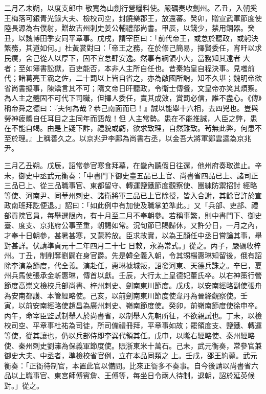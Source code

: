\begin{pinyinscope}
 二月乙未朔，以度支郎中
 敬寬為山劍行營糧料使。嚴礪奏收劍州。乙丑，入朝奚王梅落可銀青光錄大夫、檢校司空，封饒樂郡王，放還蕃。癸卯，贈宣武軍節度使陸長源為右僕射，贈故吉州刺史姜公輔禮部尚書。甲辰，以錢少，禁用銅器。癸丑，以魏博田季安同平章事。戊戌，謂宰臣曰：「前代帝王，或怠於聽政，或躬決繁務，其道如何。」杜黃裳對曰：「帝王之務，在於修己簡易，擇賢委任，宵旰以求民瘼，舍己從人以厚下，固不宜怠肆安逸。然事有綱領小大，當務知其遠者
 大者；至如簿書訟獄，百吏能否，本非人主所自任也。昔秦始皇自程決事。見嗤前代；諸葛亮王霸之佐，二十罰以上皆自省之，亦為敵國所誚，知不久堪；魏明帝欲省尚書擬事，陳矯言其不可；隋文帝日旰聽政，令衛士傳餐，文皇帝亦笑其煩察。為人主之體固不可代下司職，但擇人委任，責其成效，賞罰必信，誰不盡心。《傳》稱帝舜之德曰：『夫何為哉？恭己南面而已！』誠以能舉十六相，去四兇也。豈與勞神疲體自任耳目之主同年而語哉！但
 人主常勢。患在不能推誠，人臣之弊，患在不能自竭。由是上疑下詐，禮貌或虧，欲求致理，自然難致。茍無此弊，何患不至於理。』上稱善久之。以京兆尹李鄘為尚書右丞，以金吾大將軍鄭雲逵為京兆尹。



 三月乙丑朔。戊辰，詔常參官寒食拜墓，在畿內聽假日往還，他州府奏取進止。辛未，御史中丞武元衡奏：「中書門下御史臺五品已上官、尚書省四品已上、諸司正三品已上、從三品職事官、東都留守、轉運鹽鐵節度觀察使、團練防禦招討
 經略等使、河南尹、同華州刺史、諸衛將軍三品已上官除授，皆入合謝，其餘官許於宣政南班拜訖便退。」詔曰：「如此例中有加使及職掌並準此。」又「兵部、吏部、禮部貢院官員，每舉選限內，有十月至二月不奉朝參。若稱事繁，則中書門下、御史臺、度支、京兆府公事至重，朝謁如常。況旬節已賜歸休，又許分日，一月之內，才奉十日朝參，甚暑甚寒，又蒙矜放。臣求故實，以為王顏任中丞日嘗論其事，舉對甚詳。伏請準貞元十二年四月二十七
 日敕，永為常式。」從之。丙子，嚴礪收梓州。丁丑，制削奪劉闢在身官爵。先是韓全義入朝，令其甥楊惠琳知留後，俄有詔除李演為節度，代全義。演赴任，惠琳據城叛，詔發河東、天德兵誅之。辛巳，夏州兵馬使張承金斬惠琳，傳首以獻。壬辰，大行太上皇德妃董氏卒。以右神策行營節度高崇文檢校兵部尚書、梓州刺史、劍南東川節度。戊戌，以安南經略副使張舟為安南都護、本管經略使。己亥，以前劍南東川節度使韋丹為晉絳觀察使。壬
 寅，以前安南經略使趙昌為廣州刺史、嶺南節度使。癸卯，前嶺南節度使徐申卒。丙午，命宰臣監試制舉人於尚書省，以制舉人先朝所征，不欲親試也。丁未，以檢校司空、平章事杜祐為司徒，所司備禮冊拜，平章事如故；罷領度支、鹽鐵、轉運等使，從其讓也，仍以兵部侍即李巽代領其任。戊申，以隴右經略使、秦州經略使、秦州刺史劉澭為保義軍節度使。賑浙東米十萬石。己未，武元衡奏，常參官兼御史大夫、中丞者，準檢校省官例，立在本品同類之
 上。壬戌，邵王約薨。武元衡奏：「正衙待制官，本置此官以備問。比來正衙多不奏事。自今後請以尚書省六品以上職事官、東宮師傅賓詹、王傅等，每坐日令兩人待制，退朝，詔於延英候對。」從之。




\end{pinyinscope}
